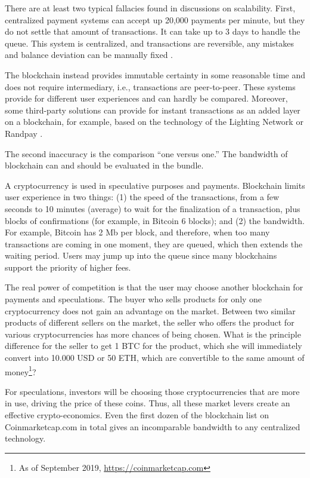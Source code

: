 \begin{multicols}{2}
There are at least two typical fallacies found in discussions on scalability. First, centralized payment systems can accept up 20,000 payments per minute, but they do not settle that amount of transactions. It can take up to 3 days to handle the queue. This system is centralized, and transactions are reversible, any mistakes and balance deviation can be manually fixed \cite{art1-key45}.

The blockchain instead provides immutable certainty in some reasonable time and does not require intermediary, i.e., transactions are peer-to-peer. These systems provide for different user experiences and can hardly be compared. Moreover, some third-party solutions can provide for instant transactions as an added layer on a blockchain, for example, based on the technology of the Lighting Network \cite{art1-key46} or Randpay \cite{art1-key47}.

The second inaccuracy is the comparison “one versus one.” The bandwidth of blockchain can and should be evaluated in the bundle.

A cryptocurrency is used in speculative purposes and payments. Blockchain limits user experience in two things: (1) the speed of the transactions, from a few seconds to 10 minutes (average) to wait for the finalization of a transaction, plus blocks of confirmations (for example, in Bitcoin 6 blocks); and (2) the bandwidth. For example, Bitcoin has 2 Mb per block, and therefore, when too many transactions are coming in one moment, they are queued, which then extends the waiting period. Users may jump up into the queue since many blockchains support the priority of higher fees.

The real power of competition is that the user may choose another blockchain for payments and speculations. The buyer who sells products for only one cryptocurrency does not gain an advantage on the market. Between two similar products of different sellers on the market, the seller who offers the product for various cryptocurrencies has more chances of being chosen. What is the principle difference for the seller to get 1 BTC for the product, which she will immediately convert into 10.000 USD or 50 ETH, which are convertible to the same amount of money\footnote{As of September 2019, \url{https://coinmarketcap.com}}?

For speculations, investors will be choosing those cryptocurrencies that are more in use, driving the price of these coins. Thus, all these market levers create an effective crypto-economics. Even the first dozen of the blockchain list on Coinmarketcap.com in total gives an incomparable bandwidth to any centralized technology.


\end{multicols}
